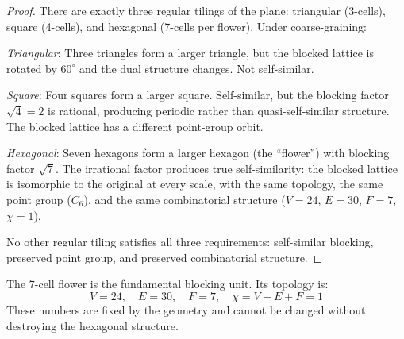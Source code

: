 \documentclass[12pt,a4paper]{article}
\theoremstyle{plain}
\theoremstyle{definition}
\begin{document}
\begin{proof}
There are exactly three regular tilings of the plane: triangular (3-cells), square (4-cells), and hexagonal (7-cells per flower). Under coarse-graining:

\emph{Triangular}: Three triangles form a larger triangle, but the blocked lattice is rotated by $60^\circ$ and the dual structure changes. Not self-similar.

\emph{Square}: Four squares form a larger square. Self-similar, but the blocking factor $\sqrt{4} = 2$ is rational, producing periodic rather than quasi-self-similar structure. The blocked lattice has a different point-group orbit.

\emph{Hexagonal}: Seven hexagons form a larger hexagon (the ``flower'') with blocking factor $\sqrt{7}$. The irrational factor produces true self-similarity: the blocked lattice is isomorphic to the original at every scale, with the same topology, the same point group ($C_6$), and the same combinatorial structure ($V = 24$, $E = 30$, $F = 7$, $\chi = 1$).

No other regular tiling satisfies all three requirements: self-similar blocking, preserved point group, and preserved combinatorial structure. \qedhere
\end{proof}

The 7-cell flower is the fundamental blocking unit. Its topology is:
\begin{equation}\label{eq:flower-topology}
V = 24, \quad E = 30, \quad F = 7, \quad \chi = V - E + F = 1
\end{equation}
These numbers are fixed by the geometry and cannot be changed without destroying the hexagonal structure.
\end{document}

